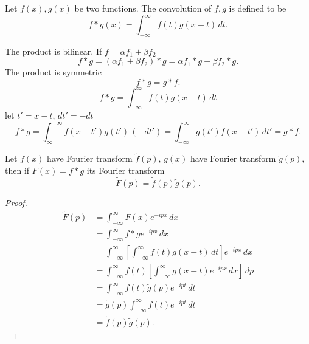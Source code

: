 \documentclass[10pt, a4paper]{article}
\begin{document}
\begin{definition}[Convolution]
    Let $f(x), g(x)$ be two functions.
    The convolution of $f, g$ is defined to be
    \[
    f * g(x) = \int_{-\infty}^{\infty}f(t)g(x - t)\,dt.
    \]
\end{definition}
The product is bilinear.
If $f = \alpha f_1 + \beta f_2$
\[
f * g = (\alpha f_1 + \beta f_2) * g = \alpha f_1 * g + \beta f_2 * g.
\]
The product is symmetric
\[
f * g = g * f.
\]
\[
f * g = \int_{-\infty}^{\infty}f(t)g(x - t)\,dt
\]
let $t' = x - t$,
$dt' = -dt$
\[
f * g = \int_{\infty}^{-\infty}f(x - t')g(t')\,(-dt') = \int_{-\infty}^{\infty}g(t')f(x - t')\,dt' = g * f.
\]

\begin{theorem}
    Let $f(x)$ have Fourier transform $\tilde{f}(p)$,
    $g(x)$ have Fourier transform $\tilde{g}(p)$,
    then if $F(x) = f * g$ its Fourier transform
    \[
    \tilde{F}(p) = \tilde{f}(p)\tilde{g}(p).
    \]

    \begin{proof}
        \begin{align*}
            \tilde{F}(p) &= \int_{-\infty}^{\infty}F(x)e ^ {-ipx}\,dx \\
            &= \int_{-\infty}^{\infty}f * ge ^ {-ipx}\,dx \\
            &= \int_{-\infty}^{\infty}\left[\int_{-\infty}^{\infty}f(t)g(x - t)\,dt\right]e ^ {-ipx}\,dx \\
            &= \int_{-\infty}^{\infty}f(t)\left[\int_{-\infty}^{\infty}g(x - t)e ^ {-ipx}\,dx\right]\,dp \\
            &= \int_{-\infty}^{\infty}f(t)\tilde{g}(p)e ^ {-ipt}\,dt \\
            &= \tilde{g}(p)\int_{-\infty}^{\infty}f(t)e ^ {-ipt}\,dt \\
            &= \tilde{f}(p)\tilde{g}(p).
        \end{align*}
        \[
        \]
    \end{proof}
\end{theorem}
\end{document}
